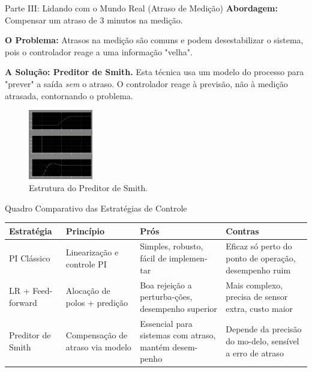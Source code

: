 \documentclass{beamer}
\begin{document}
\begin{frame}{Parte III: Lidando com o Mundo Real (Atraso de Medição)}
    \large \textbf{Abordagem:} Compensar um atraso de 3 minutos na medição.
    \vspace{0.5em}
    
    \small
    \textbf{O Problema:} Atrasos na medição são comuns e podem desestabilizar o sistema, pois o controlador reage a uma informação "velha".
    
    \vspace{0.5em}
    
    \textbf{A Solução: Preditor de Smith.} Esta técnica usa um modelo do processo para "prever" a saída \textit{sem} o atraso. O controlador reage à previsão, não à medição atrasada, contornando o problema.
    
    \begin{figure}
        \centering
        \includegraphics[width=0.25\textwidth]{Imagens/q13.png}
        \caption{\tiny Estrutura do Preditor de Smith.}
    \end{figure}
    
\end{frame}

\begin{frame}{Quadro Comparativo das Estratégias de Controle}
    \centering
    \tiny
    \renewcommand{\arraystretch}{1.0}
    \begin{tabularx}{\textwidth}{|p{1.6cm}|p{2.1cm}|p{2.6cm}|p{2.6cm}|}
        \hline
        \textbf{Estratégia} & \textbf{Princípio} & \textbf{Prós} & \textbf{Contras} \\
        \hline
        PI Clássico & Linearização e controle PI & Simples, robusto, fácil de implemen-tar & Eficaz só perto do ponto de operação, desempenho ruim \\
        \hline
        LR + Feed-forward & Alocação de polos + predição & Boa rejeição a perturba-ções, desempenho superior & Mais complexo, precisa de sensor extra, custo maior \\
        \hline
        Preditor de Smith & Compensação de atraso via modelo & Essencial para sistemas com atraso, mantém desem-penho & Depende da precisão do mo-delo, sensível a erro de atraso \\
        \hline
    \end{tabularx}
\end{frame}
\end{document}
